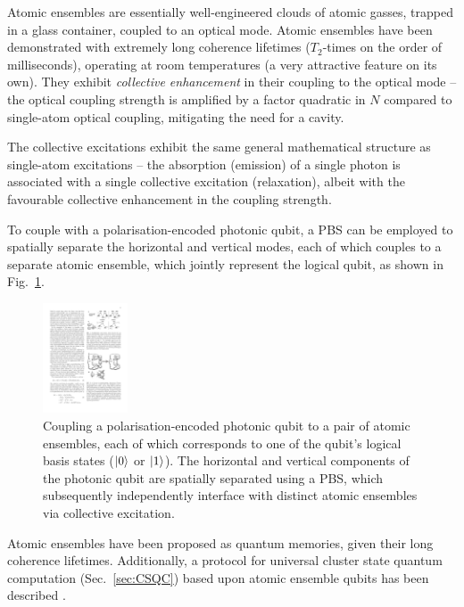Atomic ensembles are essentially well-engineered clouds of atomic gasses, trapped in a glass container, coupled to an optical mode. Atomic ensembles have been demonstrated with extremely long coherence lifetimes ($T_2$-times on the order of milliseconds), operating at room temperatures (a very attractive feature on its own). They exhibit \textit{collective enhancement} in their coupling to the optical mode -- the optical coupling strength is amplified by a factor quadratic in $N$ compared to single-atom optical coupling, mitigating the need for a cavity.

The collective excitations exhibit the same general mathematical structure as single-atom excitations -- the absorption (emission) of a single photon is associated with a single collective excitation (relaxation), albeit with the favourable collective enhancement in the coupling strength.

To couple with a polarisation-encoded photonic qubit, a PBS can be employed to spatially separate the horizontal and vertical modes, each of which couples to a separate atomic ensemble, which jointly represent the logical qubit, as shown in Fig.~\ref{fig:atomic_ensemble_qubit}.

\begin{figure}[!htbp]
\includegraphics[clip=true, width=0.225\textwidth]{atomic_ensemble_qubit}
\captionspacefig \caption{Coupling a polarisation-encoded photonic qubit to a pair of atomic ensembles, each of which corresponds to one of the qubit's logical basis states ($|0\rangle$ or $|1\rangle$). The horizontal and vertical components of the photonic qubit are spatially separated using a PBS, which subsequently independently interface with distinct atomic ensembles via collective excitation.} \label{fig:atomic_ensemble_qubit}
\end{figure}

Atomic ensembles have been proposed as quantum memories, given their long coherence lifetimes. Additionally, a protocol for universal cluster state quantum computation (Sec.~\ref{sec:CSQC}) based upon atomic ensemble qubits has been described \cite{bib:RohdeAtEns10}.

